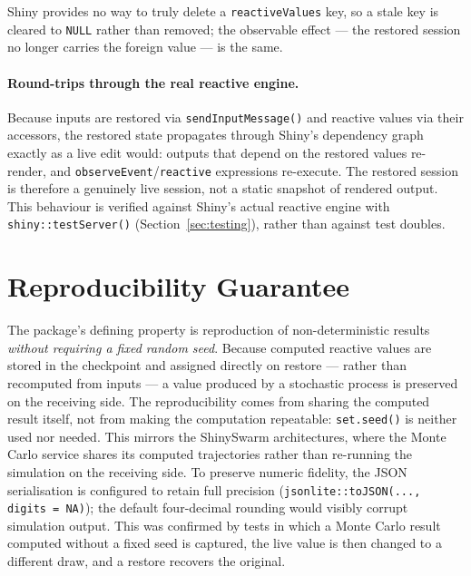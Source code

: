 \documentclass[11pt,a4paper]{article}
\begin{document}
\noindent
Shiny provides no way to truly delete a \texttt{reactiveValues} key, so a stale
key is cleared to \texttt{NULL} rather than removed; the observable effect ---
the restored session no longer carries the foreign value --- is the same.

\paragraph{Round-trips through the real reactive engine.} Because inputs are
restored via \texttt{sendInputMessage()} and reactive values via their accessors,
the restored state propagates through Shiny's dependency graph exactly as a live
edit would: outputs that depend on the restored values re-render, and
\texttt{observeEvent}/\texttt{reactive} expressions re-execute. The restored
session is therefore a genuinely live session, not a static snapshot of rendered
output. This behaviour is verified against Shiny's actual reactive engine with
\texttt{shiny::testServer()} (Section~\ref{sec:testing}), rather than against
test doubles.

\section{Reproducibility Guarantee}

The package's defining property is reproduction of non-deterministic results
\emph{without requiring a fixed random seed}. Because computed reactive values
are stored in the checkpoint and assigned directly on restore --- rather than
recomputed from inputs --- a value produced by a stochastic process is preserved
on the receiving side. The reproducibility comes from sharing the computed result
itself, not from making the computation repeatable: \texttt{set.seed()} is
neither used nor needed. This mirrors the ShinySwarm architectures, where the
Monte Carlo service shares its computed trajectories rather than re-running the
simulation on the receiving side. To preserve numeric fidelity, the JSON
serialisation is configured to retain full precision
(\texttt{jsonlite::toJSON(..., digits = NA)}); the default four-decimal rounding
would visibly corrupt simulation output. This was confirmed by tests in which a
Monte Carlo result computed without a fixed seed is captured, the live value is
then changed to a different draw, and a restore recovers the original.
\end{document}
